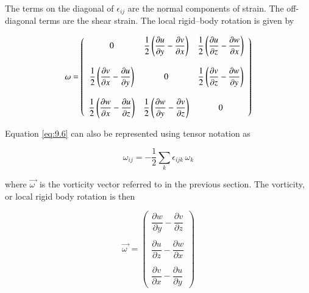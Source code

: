 The terms on the diagonal of $\epsilon_{ij}$ are the normal components of strain. The off-diagonal terms are the shear strain. The local rigid--body rotation is given by

\begin{equation}\label{eq:9.6}
\mathbf{\omega} = \left(
\begin{array}{c c c}
  0 &
  \dfrac{1}{2}\left(\dfrac{\partial u}{\partial y} - \dfrac{\partial v}{\partial x}\right) &
  \dfrac{1}{2}\left(\dfrac{\partial u}{\partial z} - \dfrac{\partial w}{\partial x}\right) \\ \\
  \dfrac{1}{2}\left(\dfrac{\partial v}{\partial x} - \dfrac{\partial u}{\partial y}\right) &
  0 &
  \dfrac{1}{2}\left(\dfrac{\partial v}{\partial z} - \dfrac{\partial w}{\partial y}\right) \\ \\
  \dfrac{1}{2}\left(\dfrac{\partial w}{\partial x} - \dfrac{\partial u}{\partial z}\right) &
  \dfrac{1}{2}\left(\dfrac{\partial w}{\partial y} - \dfrac{\partial v}{\partial z}\right) &
  0
\end{array}\right)
\end{equation}

Equation \ref{eq:9.6} can also be represented using tensor notation as

\begin{equation}\label{eq:9.7}
\omega_{ij} = -\dfrac{1}{2}\sum_{k} \epsilon_{ijk}\, \omega_{k}
\end{equation}

where $\overrightarrow{\omega\ }$ is the vorticity vector referred to in the previous section. The vorticity, or local rigid body rotation is then

\begin{equation}\label{eq:9.8}
\overrightarrow{\omega\ } = \left(
\begin{array}{c}
\dfrac{\partial w}{\partial y} - \dfrac{\partial v}{\partial z} \\ \\
\dfrac{\partial u}{\partial z} - \dfrac{\partial w}{\partial x} \\ \\
\dfrac{\partial v}{\partial x} - \dfrac{\partial u}{\partial y}
\end{array}
\right)
\end{equation}

